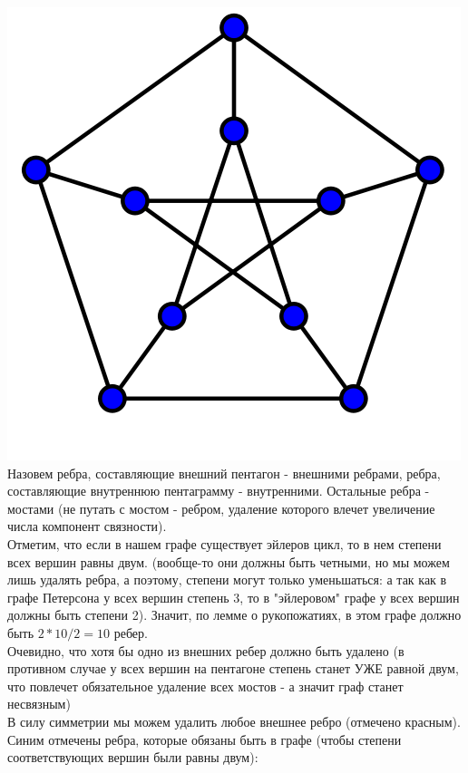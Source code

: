 \documentclass[10pt,a4paper]{article}
\begin{document}
\begin{enumerate}
\begin{enumerate}
	\includegraphics[scale=0.4]{petersen.png}\\
	Назовем ребра, составляющие внешний пентагон - внешними ребрами, ребра, составляющие внутреннюю пентаграмму - внутренними. Остальные ребра - мостами (не путать с мостом - ребром, удаление которого влечет увеличение числа компонент связности).\\
	Отметим, что если в нашем графе существует эйлеров цикл, то в нем степени всех вершин равны двум. (вообще-то они должны быть четными, но мы можем лишь удалять ребра, а поэтому, степени могут только уменьшаться: а так как в графе Петерсона у всех вершин степень 3, то в "эйлеровом" графе у всех вершин должны быть степени 2). Значит, по лемме о рукопожатиях, в этом графе должно быть $2*10/2 = 10$ ребер.\\
	Очевидно, что хотя бы одно из внешних ребер должно быть удалено (в противном случае у всех вершин на пентагоне степень станет УЖЕ равной двум, что повлечет обязательное удаление всех мостов - а значит граф станет несвязным)\\
	В силу симметрии мы можем удалить любое внешнее ребро (отмечено красным). Синим отмечены ребра, которые обязаны быть в графе (чтобы степени соответствующих вершин были равны двум):

\end{enumerate}
\end{enumerate}
\end{document}
